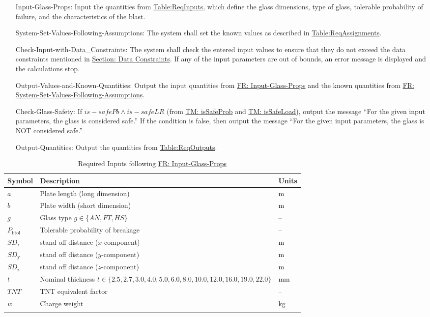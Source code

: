 \documentclass[12pt]{article}
\begin{document}
\begin{itemize}
\item[Input-Glass-Props:\phantomsection\label{inputGlassProps}]{Input the quantities from \hyperref[Table:ReqInputs]{Table:ReqInputs}, which define the glass dimensions, type of glass, tolerable probability of failure, and the characteristics of the blast.}
\item[System-Set-Values-Following-Assumptions:\phantomsection\label{sysSetValsFollowingAssumps}]{The system shall set the known values as described in \hyperref[Table:ReqAssignments]{Table:ReqAssignments}.}
\item[Check-Input-with-Data\_Constraints:\phantomsection\label{checkInputWithDataCons}]{The system shall check the entered input values to ensure that they do not exceed the data constraints mentioned in \hyperref[Sec:DataConstraints]{Section: Data Constraints}. If any of the input parameters are out of bounds, an error message is displayed and the calculations stop.}
\item[Output-Values-and-Known-Quantities:\phantomsection\label{outputValsAndKnownQuants}]{Output the input quantities from \hyperref[inputGlassProps]{FR: Input-Glass-Props} and the known quantities from \hyperref[sysSetValsFollowingAssumps]{FR: System-Set-Values-Following-Assumptions}.}
\item[Check-Glass-Safety:\phantomsection\label{checkGlassSafety}]{If $is-safePb\land{}is-safeLR$ (from \hyperref[TM:isSafeProb]{TM: isSafeProb} and \hyperref[TM:isSafeLoad]{TM: isSafeLoad}), output the message ``For the given input parameters, the glass is considered safe.'' If the condition is false, then output the message ``For the given input parameters, the glass is NOT considered safe.''}
\item[Output-Quantities:\phantomsection\label{outputQuants}]{Output the quantities from \hyperref[Table:ReqOutputs]{Table:ReqOutputs}.}
\end{itemize}
\begin{longtabu}{l X[l] l}
\toprule
\textbf{Symbol} & \textbf{Description} & \textbf{Units}
\\
\midrule
\endhead
$a$ & Plate length (long dimension) & m
\\
$b$ & Plate width (short dimension) & m
\\
$g$ & Glass type $g\in{}\{AN,FT,HS\}$ & --
\\
${P_{\text{b}\text{tol}}}$ & Tolerable probability of breakage & --
\\
${SD_{\text{x}}}$ & stand off distance ($x$-component) & m
\\
${SD_{\text{y}}}$ & stand off distance ($y$-component) & m
\\
${SD_{\text{z}}}$ & stand off distance ($z$-component) & m
\\
$t$ & Nominal thickness $t\in{}\{2.5,2.7,3.0,4.0,5.0,6.0,8.0,10.0,12.0,16.0,19.0,22.0\}$ & mm
\\
$TNT$ & TNT equivalent factor & --
\\
$w$ & Charge weight & kg
\\
\bottomrule
\caption{Required Inputs following \hyperref[inputGlassProps]{FR: Input-Glass-Props}}
\label{Table:ReqInputs}
\end{longtabu}
\end{document}
